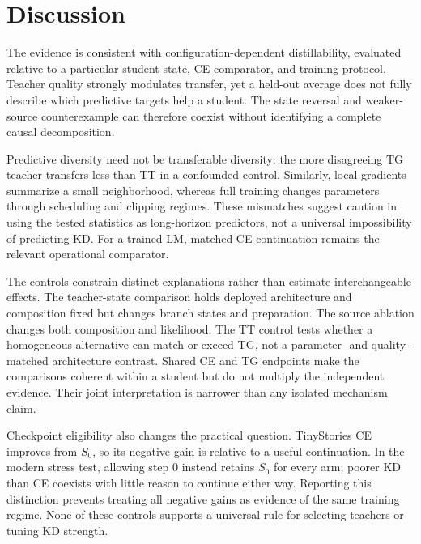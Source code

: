 \section{Discussion}\label{sec:discussion}

The evidence is consistent with configuration-dependent distillability, evaluated relative to a particular student state, CE comparator, and training protocol. Teacher quality strongly modulates transfer, yet a held-out average does not fully describe which predictive targets help a student. The state reversal and weaker-source counterexample can therefore coexist without identifying a complete causal decomposition.

Predictive diversity need not be transferable diversity: the more disagreeing TG teacher transfers less than TT in a confounded control. Similarly, local gradients summarize a small neighborhood, whereas full training changes parameters through scheduling and clipping regimes. These mismatches suggest caution in using the tested statistics as long-horizon predictors, not a universal impossibility of predicting KD. For a trained LM, matched CE continuation remains the relevant operational comparator.

The controls constrain distinct explanations rather than estimate interchangeable effects. The teacher-state comparison holds deployed architecture and composition fixed but changes branch states and preparation. The source ablation changes both composition and likelihood. The TT control tests whether a homogeneous alternative can match or exceed TG, not a parameter- and quality-matched architecture contrast. Shared CE and TG endpoints make the comparisons coherent within a student but do not multiply the independent evidence. Their joint interpretation is narrower than any isolated mechanism claim.

Checkpoint eligibility also changes the practical question. TinyStories CE improves from $S_0$, so its negative gain is relative to a useful continuation. In the modern stress test, allowing step 0 instead retains $S_0$ for every arm; poorer KD than CE coexists with little reason to continue either way. Reporting this distinction prevents treating all negative gains as evidence of the same training regime. None of these controls supports a universal rule for selecting teachers or tuning KD strength.
